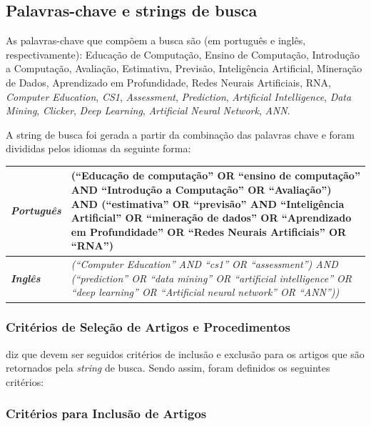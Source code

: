\documentclass[
	12pt,				%
	openright,			%
	oneside,
	a4paper,			%
	english,			%
	french,				%
	spanish,			%
	brazil,				%
	]{abntex2}
\begin{document}
\subsection{Palavras-chave e strings de busca}
As palavras-chave que compõem a busca são (em português e inglês, respectivamente): 
Educação de Computação, Ensino de Computação, Introdução a Computação, Avaliação, Estimativa, Previsão, Inteligência Artificial, Mineração de Dados, Aprendizado em Profundidade, Redes Neurais Artificiais, RNA, \textit{Computer Education}, \textit{CS1}, \textit{Assessment}, \textit{Prediction}, \textit{Artificial Intelligence}, \textit{Data Mining}, \textit{Clicker}, \textit{Deep Learning}, \textit{Artificial Neural Network}, \textit{ANN}.

A string de busca foi gerada a partir da combinação das palavras chave e foram divididas pelos idiomas da seguinte forma: 

\begin{table}[!htb]
\centering
\caption{String de Busca}
\label{string-busca}
\begin{longtable}{|| p{3cm} || p{10cm} ||}
    \hline \hline
\textit{\textbf{Português}} & (``Educação de computação'' OR ``ensino de computação'' AND ``Introdução a Computação'' OR ``Avaliação'') AND (``estimativa'' OR ``previsão'' AND ``Inteligência Artificial'' OR ``mineração de dados'' OR ``Aprendizado em Profundidade'' OR ``Redes Neurais Artificiais'' OR ``RNA'')\\
\hline \hline
\textit{\textbf{Inglês}} & \textit{(``Computer Education'' AND ``cs1'' OR ``assessment'') AND (``prediction'' OR ``data mining'' OR ``artificial intelligence'' OR ``deep learning'' OR ``Artificial neural network'' OR ``ANN''))}\\
 \hline \hline
\end{longtable}
\end{table}

\subsubsection{Critérios de Seleção de Artigos e Procedimentos}
 diz que devem ser seguidos critérios de inclusão e exclusão para os artigos que são retornados pela \textit{string} de busca. Sendo assim, foram definidos os seguintes critérios:

\subsubsection{Critérios para Inclusão de Artigos}
\end{document}
